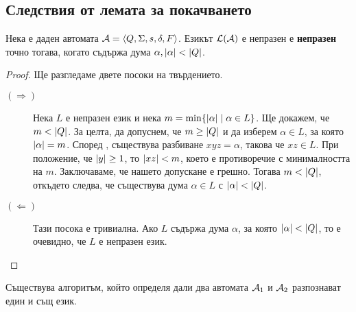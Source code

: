 \subsection*{Следствия от лемата за покачването}

\begin{prop}
  Нека е даден автомата $\mathcal{A} = \langle{Q,\Sigma,s,\delta,F}\rangle$.
  Езикът $\mathcal{L}(\mathcal{A})$ е непразен е {\bf непразен} точно тогава, когато съдържа дума $\alpha, \lvert{\alpha}\rvert < \lvert{Q}\rvert$.
\end{prop}
\begin{proof}
  Ще разгледаме двете посоки на твърдението.
  \begin{description}
  \item[$(\Rightarrow)$]
    Нека $L$ е непразен език и нека $m = \min\{\lvert{\alpha}\rvert \mid \alpha \in L\}$.
    Ще докажем, че $m < \lvert{Q}\rvert$.    
    За целта, да допуснем, че $m \geq \lvert{Q}\rvert$ и да изберем $\alpha \in L$, за която $\lvert{\alpha}\rvert = m$.
    Според , съществува разбиване $xyz = \alpha$, 
    такова че $xz \in L$.
    При положение, че $\lvert{y}\rvert \geq 1$, то $\lvert{xz}\rvert < m$, което 
    е противоречие с минималността на $m$.
    Заключаваме, че нашето допускане е грешно. Тогава $m < \lvert{Q}\rvert$, откъдето следва, че 
    съществува дума $\alpha \in L$ с $\lvert{\alpha}\rvert < \lvert{Q}\rvert$.
  \item[$(\Leftarrow)$]
    Тази посока е тривиална.
    Ако $L$ съдържа дума $\alpha$, за която $\lvert{\alpha}\rvert < \lvert{Q}\rvert$,
    то е очевидно, че $L$ е непразен език.
  \end{description}
\end{proof}

\begin{cor}
  Съществува алгоритъм, който определя дали два автомата $\mathcal{A}_1$ и $\mathcal{A}_2$ разпознават един и същ език.
\end{cor}

